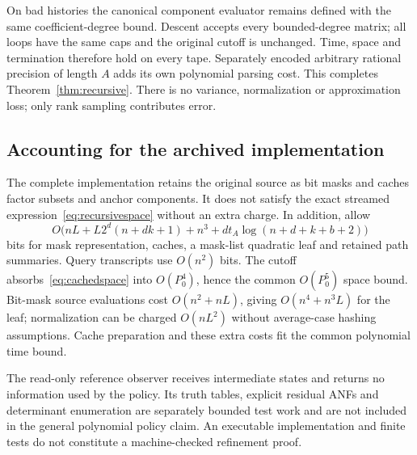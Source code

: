 \documentclass[11pt]{article}
\theoremstyle{remark}\newtheorem{remark}[theorem]{Remark}
\begin{document}
On bad histories the canonical component evaluator remains defined with the same coefficient-degree bound. Descent accepts every bounded-degree matrix; all loops have the same caps and the original cutoff is unchanged. Time, space and termination therefore hold on every tape. Separately encoded arbitrary rational precision of length $A$ adds its own polynomial parsing cost. This completes Theorem~\ref{thm:recursive}. There is no variance, normalization or approximation loss; only rank sampling contributes error.

\subsection{Accounting for the archived implementation}
The complete implementation retains the original source as bit masks and caches factor subsets and anchor components. It does not satisfy the exact streamed expression~\eqref{eq:recursivespace} without an extra charge. In addition, allow
\begin{equation}\label{eq:cachedspace}
 O\bigl(nL+L2^d(n+dk+1)+n^3+dt_A\log(n+d+k+b+2)\bigr)
\end{equation}
bits for mask representation, caches, a mask-list quadratic leaf and retained path summaries. Query transcripts use $O(n^2)$ bits. The cutoff absorbs~\eqref{eq:cachedspace} into $O(P_0^4)$, hence the common $O(P_0^5)$ space bound. Bit-mask source evaluations cost $O(n^2+nL)$, giving $O(n^4+n^3L)$ for the leaf; normalization can be charged $O(nL^2)$ without average-case hashing assumptions. Cache preparation and these extra costs fit the common polynomial time bound.

The read-only reference observer receives intermediate states and returns no information used by the policy. Its truth tables, explicit residual ANFs and determinant enumeration are separately bounded test work and are not included in the general polynomial policy claim. An executable implementation and finite tests do not constitute a machine-checked refinement proof.
\end{document}
